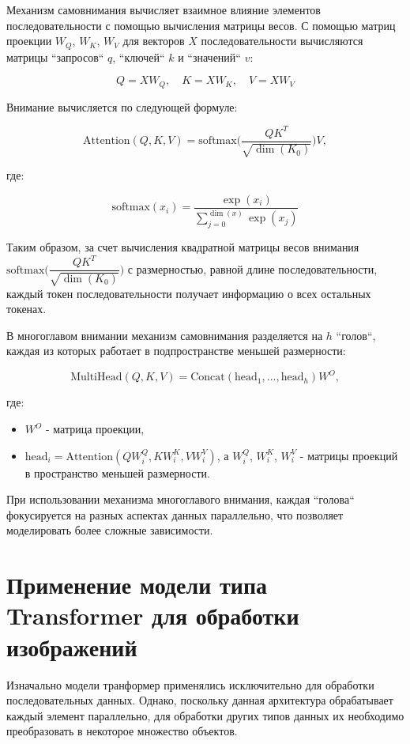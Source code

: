 \documentclass[times,specification,annotation]{itmo-student-thesis}
\begin{document}
Механизм самовнимания вычисляет взаимное влияние элементов последовательности с помощью вычисления матрицы весов. С помощью матриц проекции $W_Q$, $W_K$, $W_V$ для векторов $X$ последовательности вычисляются матрицы ``запросов`` $q$, ``ключей`` $k$ и ``значений`` $v$:

$$
Q = X W_Q, \quad K = X W_K, \quad V = X W_V 
$$

Внимание вычисляется по следующей формуле:

$$
\text{Attention}(Q, K, V) = \text{softmax}\Big(\dfrac{QK^T}{\sqrt{\dim(K_0)}}\Big)V,
$$

где:

$$
\text{softmax}(x_i) = \dfrac{\exp(x_i)}{\sum\limits_{j=0}^{\dim(x)}\exp(x_j)}
$$

Таким образом, за счет вычисления квадратной матрицы весов внимания $\text{softmax}\Big(\dfrac{QK^T}{\sqrt{\dim(K_0)}}\Big)$ с размерностью, равной длине последовательности, каждый токен последовательности получает информацию о всех остальных токенах.

В многоглавом внимании механизм самовнимания разделяется на $h$ ``голов``, каждая из которых работает в подпространстве меньшей размерности:

$$
\text{MultiHead}(Q, K, V) = \text{Concat}(\text{head}_1, ..., \text{head}_h)W^O,
$$

где: 
\begin{itemize}
    \item $W^O$ - матрица проекции,
    \item $\text{head}_i = \text{Attention}(Q W_i^Q, K W_i^K, V W_i^V)$, а $W_i^Q$, $W_i^K$, $W_i^V$ - матрицы проекций в пространство меньшей размерности.
\end{itemize}

При использовании механизма многоглавого внимания, каждая ``голова`` фокусируется на разных аспектах данных параллельно, что позволяет моделировать более сложные зависимости.

\section{Применение модели типа Transformer для обработки изображений}

Изначально модели транформер применялись исключительно для обработки последовательных данных. Однако, поскольку данная архитектура обрабатывает каждый элемент параллельно, для обработки других типов данных их необходимо преобразовать в некоторое множество объектов. 
\end{document}
